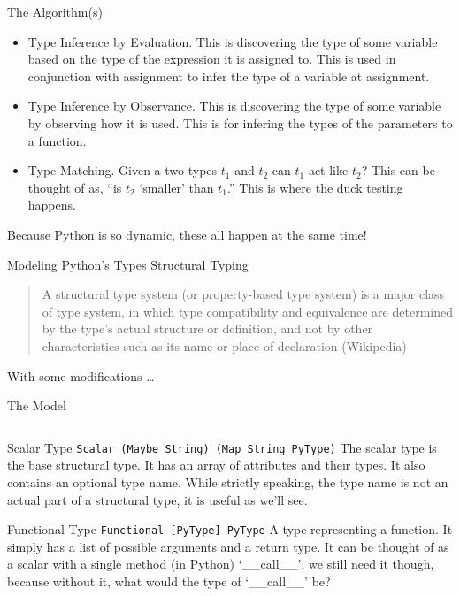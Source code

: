 \documentclass[12pt,t]{beamer}
\newcommand{\bi}{\begin{itemize}}
\newcommand{\ei}{\end{itemize}}
\newcommand{\codehs}{\texttt}
\newcommand{\vitem}{\vfill\item}
\begin{document}
\begin{frame}{The Algorithm(s)}
    \bi
        \vitem Type Inference by Evaluation. This is discovering the type of some
        variable based on the type of the expression it is assigned to. This is
        used in conjunction with assignment to infer the type of a variable at assignment.

        \vitem Type Inference by Observance. This is discovering the type of some
        variable by observing how it is used. This is for infering the types of the
        parameters to a function.

        \vitem Type Matching. Given a two types $t_1$ and $t_2$ can $t_1$ act like $t_2$?
        This can be thought of as, ``is $t_2$ `smaller' than $t_1$.'' This is where the
        duck testing happens.
    \ei
    Because Python is so dynamic, these all happen at the same time!
\end{frame}

\begin{frame}{Modeling Python's Types}
    \vspace{0.5cm}
    {\large \color{subtitle} {Structural Typing}}

    \begin{quote}
        A structural type system (or property-based
        type system) is a major class of type system, in which type
        compatibility and equivalence are determined by the type's actual
        structure or definition, and not by other characteristics such as its
        name or place of declaration (Wikipedia)
    \end{quote}

    \vfill
    With some modifications \ldots
\end{frame}

\begin{frame}{The Model}
    \inputminted{haskell}{code/model.hs}
\end{frame}

\begin{frame}{Scalar Type}
    \vfill
    \codehs{Scalar (Maybe String) (Map String PyType)}
    \vfill
    The scalar type is the base structural type. It
    has an array of attributes and their types. It also
    contains an optional type name. While strictly speaking,
    the type name is not an actual part of a structural type,
    it is useful as we'll see.
    \vfill
\end{frame}

\begin{frame}{Functional Type}
    \vfill
    \codehs{Functional [PyType] PyType}
    \vfill
    A type representing a function. It simply has a list
    of possible arguments and a return type. It can be thought
    of as a scalar with a single method (in Python) `\_\_call\_\_',
    we still need it though, because without it, what would the type
    of `\_\_call\_\_' be?
    \vfill
\end{frame}
\end{document}

